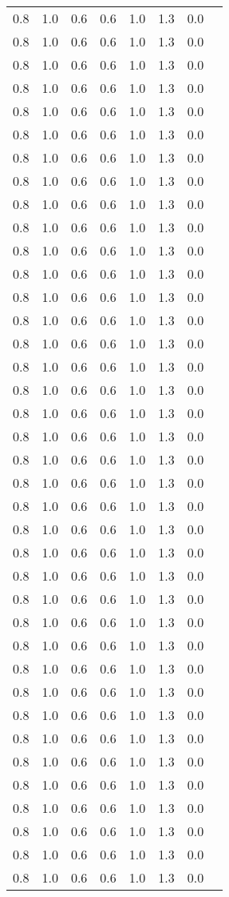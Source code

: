 \begin{tabular}{L{1in}|L{1in}|L{1in}|L{1in}|L{1in}|L{1in}|L{1in}|L{1in}}
0.8&1.0&0.6&0.6&1.0&1.3&0.0\\
0.8&1.0&0.6&0.6&1.0&1.3&0.0\\
0.8&1.0&0.6&0.6&1.0&1.3&0.0\\
0.8&1.0&0.6&0.6&1.0&1.3&0.0\\
0.8&1.0&0.6&0.6&1.0&1.3&0.0\\
0.8&1.0&0.6&0.6&1.0&1.3&0.0\\
0.8&1.0&0.6&0.6&1.0&1.3&0.0\\
0.8&1.0&0.6&0.6&1.0&1.3&0.0\\
0.8&1.0&0.6&0.6&1.0&1.3&0.0\\
0.8&1.0&0.6&0.6&1.0&1.3&0.0\\
0.8&1.0&0.6&0.6&1.0&1.3&0.0\\
0.8&1.0&0.6&0.6&1.0&1.3&0.0\\
0.8&1.0&0.6&0.6&1.0&1.3&0.0\\
0.8&1.0&0.6&0.6&1.0&1.3&0.0\\
0.8&1.0&0.6&0.6&1.0&1.3&0.0\\
0.8&1.0&0.6&0.6&1.0&1.3&0.0\\
0.8&1.0&0.6&0.6&1.0&1.3&0.0\\
0.8&1.0&0.6&0.6&1.0&1.3&0.0\\
0.8&1.0&0.6&0.6&1.0&1.3&0.0\\
0.8&1.0&0.6&0.6&1.0&1.3&0.0\\
0.8&1.0&0.6&0.6&1.0&1.3&0.0\\
0.8&1.0&0.6&0.6&1.0&1.3&0.0\\
0.8&1.0&0.6&0.6&1.0&1.3&0.0\\
0.8&1.0&0.6&0.6&1.0&1.3&0.0\\
0.8&1.0&0.6&0.6&1.0&1.3&0.0\\
0.8&1.0&0.6&0.6&1.0&1.3&0.0\\
0.8&1.0&0.6&0.6&1.0&1.3&0.0\\
0.8&1.0&0.6&0.6&1.0&1.3&0.0\\
0.8&1.0&0.6&0.6&1.0&1.3&0.0\\
0.8&1.0&0.6&0.6&1.0&1.3&0.0\\
0.8&1.0&0.6&0.6&1.0&1.3&0.0\\
0.8&1.0&0.6&0.6&1.0&1.3&0.0\\
0.8&1.0&0.6&0.6&1.0&1.3&0.0\\
0.8&1.0&0.6&0.6&1.0&1.3&0.0\\
0.8&1.0&0.6&0.6&1.0&1.3&0.0\\
0.8&1.0&0.6&0.6&1.0&1.3&0.0\\
0.8&1.0&0.6&0.6&1.0&1.3&0.0\\
0.8&1.0&0.6&0.6&1.0&1.3&0.0\\

\end{tabular}
